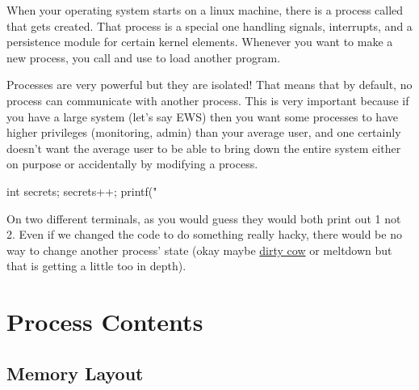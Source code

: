 When your operating system starts on a linux machine, there is a process called  that gets created. That process is a special one handling signals, interrupts, and a persistence module for certain kernel elements. Whenever you want to make a new process, you call  and use  to load another program.

Processes are very powerful but they are isolated! That means that by default, no process can communicate with another process. This is very important because if you have a large system (let's say EWS) then you want some processes to have higher privileges (monitoring, admin) than your average user, and one certainly doesn't want the average user to be able to bring down the entire system either on purpose or accidentally by modifying a process.

\begin{code}[language=C]
int secrets;
secrets++;
printf("%
\end{code}

On two different terminals, as you would guess they would both print out 1 not 2. Even if we changed the code to do something really hacky, there would be no way to change another process' state (okay maybe \href{https://en.wikipedia.org/wiki/Dirty_COW}{dirty cow} or meltdown but that is getting a little too in depth).

\section{Process Contents}\label{process-contents}

\subsection{Memory Layout}\label{memory-layout}


